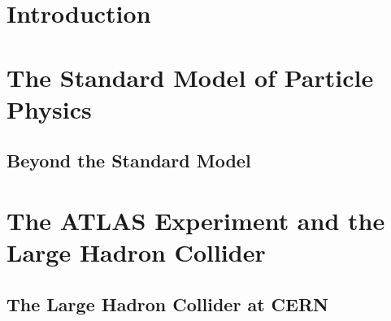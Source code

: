 \documentclass[PhD, UKenglish]{scrbook}
\begin{document}
\makethesistitle

\pagestyle{scrplain}

% 

\tableofcontents

\mainmatter
\pagestyle{scrheadings}





\chapter{Introduction}%
\label{sec:intro}



\chapter{The Standard Model of Particle Physics}%
\label{sec:standard_model}

\section{Beyond the Standard Model}

\chapter{The ATLAS Experiment and the Large Hadron Collider}%
\label{sec:atlas_and_lhc}

\section{The Large Hadron Collider at CERN}
\end{document}
